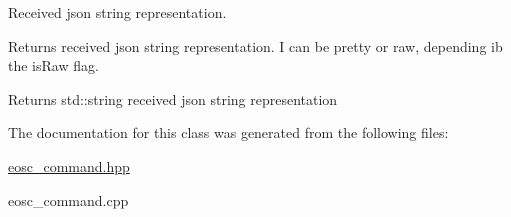 Received json string representation. 

Returns received json string representation. I can be pretty or raw, depending ib the {\ttfamily is\+Raw} flag.

\begin{DoxyReturn}{Returns}
std\+::string received json string representation 
\end{DoxyReturn}


The documentation for this class was generated from the following files\+:\begin{DoxyCompactItemize}
\item 
\hyperlink{eosc__command_8hpp}{eosc\+\_\+command.\+hpp}\item 
eosc\+\_\+command.\+cpp\end{DoxyCompactItemize}
